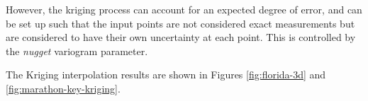 However, the kriging process can account for an expected degree of error, and can be set up such that the input points are not considered exact measurements but are considered to have their own uncertainty at each point. This is controlled by the \emph{nugget} variogram parameter.

\begin{figure}[!ht]
\begin{floatrow}
\end{floatrow}
\end{figure}


The Kriging interpolation results are shown in Figures \ref{fig:florida-3d} and \ref{fig:marathon-key-kriging}.

